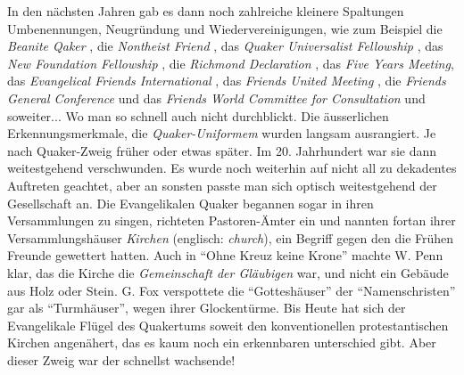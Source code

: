In den nächsten Jahren gab es dann noch zahlreiche kleinere Spaltungen
Umbenennungen, Neugründung und Wiedervereinigungen, wie zum Beispiel die \textit{Beanite Qaker} , die \textit{Nontheist Friend} , das \textit{Quaker Universalist Fellowship} , das \textit{New Foundation Fellowship} , die \textit{Richmond Declaration} , das \textit{Five Years Meeting}, das \textit{Evangelical Friends International} , das \textit{Friends United Meeting} , die \textit{Friends General Conference}  und das \textit{Friends World Committee for Consultation} und soweiter... Wo man so schnell auch nicht durchblickt.
Die äusserlichen Erkennungsmerkmale, die \textit{Quaker-Uniformem}  wurden
langsam ausrangiert. Je nach Quaker-Zweig früher oder etwas später. Im 20.
Jahrhundert war sie dann weitestgehend verschwunden. Es wurde noch weiterhin auf
nicht all zu dekadentes Auftreten geachtet, aber an sonsten passte man sich
optisch weitestgehend der Gesellschaft an. Die Evangelikalen Quaker begannen
sogar in ihren Versammlungen zu singen, richteten Pastoren-Ämter ein und nannten
fortan ihrer Versammlungshäuser \textit{Kirchen}  (englisch: \textit{church}),
ein Begriff gegen den die Frühen Freunde gewettert hatten. Auch in "`Ohne Kreuz
keine Krone"' machte W. Penn klar, das die Kirche die \textit{Gemeinschaft der
Gläubigen} war, und nicht ein Gebäude aus Holz oder Stein. G. Fox verspottete
die "`Gotteshäuser"' der "`Namenschristen"' gar als "`Turmhäuser"', wegen ihrer
Glockentürme. Bis Heute hat sich der Evangelikale Flügel des Quakertums soweit
den konventionellen protestantischen Kirchen angenähert, das es kaum noch ein
erkennbaren unterschied gibt. Aber dieser Zweig war der schnellst wachsende!

\medskip

